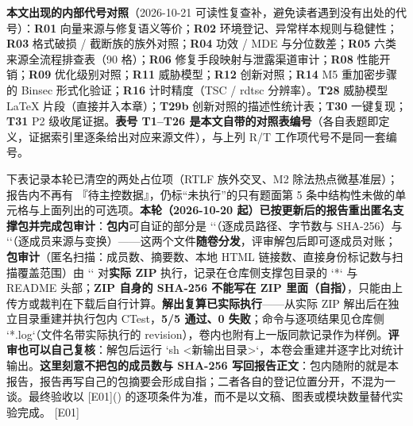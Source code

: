 \documentclass[UTF8,fontset=fandol,11pt,a4paper]{ctexart}
\begin{document}
\textbf{本文出现的内部代号对照}（2026-10-21 可读性复查补，避免读者遇到没有出处的代号）：\textbf{R01} 向量来源与修复语义等价；\textbf{R02} 环境登记、异常样本规则与稳健性；\textbf{R03} 格式破损 / 截断族的族外对照；\textbf{R04} 功效 / MDE 与分位数差；\textbf{R05} 六类来源全流程排查表（90 格）；\textbf{R06} 修复手段映射与泄露渠道审计；\textbf{R08} 性能开销；\textbf{R09} 优化级别对照；\textbf{R11} 威胁模型；\textbf{R12} 创新对照；\textbf{R14} M5 重加密步骤的 Binsec 形式化验证；\textbf{R16} 计时精度（TSC / rdtsc 分辨率）。\textbf{T28} 威胁模型 LaTeX 片段（直接并入本章）；\textbf{T29b} 创新对照的描述性统计表；\textbf{T30} 一键复现；\textbf{T31} P2 级收尾证据。\textbf{表号 T1–T26 是本文自带的对照表编号}（各自表题即定义，证据索引里逐条给出对应来源文件），与上列 R/T 工作项代号不是同一套编号。


下表记录本轮已清空的两处占位项（RTLF 族外交叉、M2 除法热点微基准层）；报告内不再有 『待主控数据』，仍标“未执行”的只有题面第 5 条中结构性未做的单元格与上面列出的可选项。\textbf{本轮（2026-10-20 起）已按更新后的报告重出匿名支撑包并完成包审计}：\textbf{包内}可自证的部分是 `\texttt{}`（逐成员路径、字节数与 SHA-256）与 `\texttt{}`（逐成员来源与变换）——这两个文件\textbf{随卷分发}，评审解包后即可逐成员对账；\textbf{包审计}（匿名扫描：成员数、摘要数、本地 HTML 链接数、直接身份标记数与扫描覆盖范围）由 `\texttt{}` 对\textbf{实际 ZIP} 执行，记录在仓库侧支撑包目录的 `*\texttt{}` 与 README 头部；\textbf{ZIP 自身的 SHA-256 不能写在 ZIP 里面（自指）}，只能由上传方或裁判在下载后自行计算。\textbf{解出复算已实际执行}——从实际 ZIP 解出后在独立目录重建并执行包内 CTest，\textbf{5/5 通过、0 失败}；命令与逐项结果见仓库侧 `\texttt{}*.log`（文件名带实际执行的 revision），卷内也附有上一版同款记录作为样例。\textbf{评审也可以自己复核}：解包后运行 `sh \texttt{} <新输出目录>`，本卷会重建并逐字比对统计输出。\textbf{这里刻意不把包的成员数与 SHA-256 写回报告正文}：包内随附的就是本报告，报告再写自己的包摘要会形成自指；二者各自的登记位置分开，不混为一谈。最终验收以 [E01](\texttt{}) 的逐项条件为准，而不是以文稿、图表或模块数量替代实验完成。 [E01]
\end{document}
